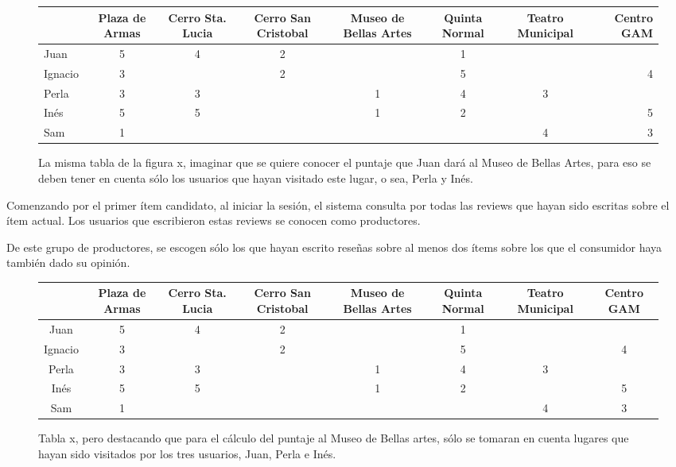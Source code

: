 \begin{figure}
\centering
\begin{adjustbox}{max width=\textwidth}
\begin{tabular}{l*{6}{c}r}
                  & Plaza de Armas & Cerro Sta. Lucia & Cerro San Cristobal & Museo de Bellas Artes & Quinta Normal  & Teatro Municipal & Centro GAM \\
\hline
\rowcolor{yellow} Juan          & 5 & 4 & 2 &   & 1 &   &   \\
\hline
Ignacio       & 3 &   & 2 &   & 5 &   & 4 \\
\hline
\rowcolor{yellow}Perla         & 3 & 3 &   & 1 & 4 & 3 &   \\
\hline
\rowcolor{yellow}Inés          & 5 & 5 &   & 1 & 2 &   & 5 \\
Sam          & 1 &  &   &  &  & 4  & 3 \\


\end{tabular}
\end{adjustbox}
\caption{La misma tabla de la figura x, imaginar que se quiere conocer el puntaje que Juan dará al Museo de Bellas Artes, para eso se deben tener en cuenta sólo los usuarios que hayan visitado este lugar, o sea, Perla y Inés.}

\end{figure}

Comenzando por el primer ítem candidato, al iniciar la sesión, el sistema consulta por todas las reviews que hayan sido escritas sobre el ítem actual. Los usuarios que escribieron estas reviews se conocen como productores.

De este grupo de productores, se escogen sólo los que hayan escrito reseñas sobre al menos dos ítems sobre los que el consumidor haya también dado su opinión.
\begin{figure}
\centering
\begin{adjustbox}{max width=\textwidth}
\begin{tabular}{|c|g|g|c|c|g|c|c|}

                  & Plaza de Armas & Cerro Sta. Lucia & Cerro San Cristobal & Museo de Bellas Artes & Quinta Normal  & Teatro Municipal & Centro GAM \\
\hline
Juan          & 5 & 4 & 2 &   & 1 &   &   \\
\hline
{}Ignacio       & 3 &   & 2 &   & 5 &   & 4 \\
\hline
Perla         & 3 & 3 &   & 1 & 4 & 3 &   \\
\hline
Inés          & 5 & 5 &   & 1 & 2 &   & 5 \\
\hline
Sam          & 1 &  &   &  &  & 4  & 3 \\
\hline

\end{tabular}
\end{adjustbox}
\caption{Tabla x, pero destacando que para el cálculo del puntaje al Museo de Bellas artes, sólo se tomaran en cuenta lugares que hayan sido visitados por los tres usuarios, Juan, Perla e Inés.}

\end{figure}


